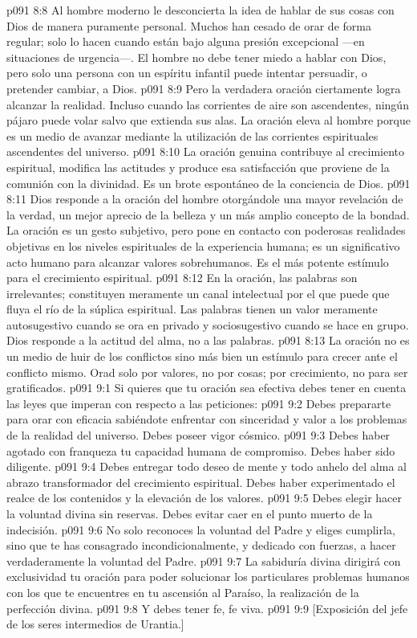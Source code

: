 \vs p091 8:8 \pc Al hombre moderno le desconcierta la idea de hablar de sus cosas con Dios de manera puramente personal. Muchos han cesado de orar de forma regular; solo lo hacen cuando están bajo alguna presión excepcional ---en situaciones de urgencia---. El hombre no debe tener miedo a hablar con Dios, pero solo una persona con un espíritu infantil puede intentar persuadir, o pretender cambiar, a Dios.
\vs p091 8:9 \pc Pero la verdadera oración ciertamente logra alcanzar la realidad. Incluso cuando las corrientes de aire son ascendentes, ningún pájaro puede volar salvo que extienda sus alas. La oración eleva al hombre porque es un medio de avanzar mediante la utilización de las corrientes espirituales ascendentes del universo.
\vs p091 8:10 La oración genuina contribuye al crecimiento espiritual, modifica las actitudes y produce esa satisfacción que proviene de la comunión con la divinidad. Es un brote espontáneo de la conciencia de Dios.
\vs p091 8:11 Dios responde a la oración del hombre otorgándole una mayor revelación de la verdad, un mejor aprecio de la belleza y un más amplio concepto de la bondad. La oración es un gesto subjetivo, pero pone en contacto con poderosas realidades objetivas en los niveles espirituales de la experiencia humana; es un significativo acto humano para alcanzar valores sobrehumanos. Es el más potente estímulo para el crecimiento espiritual.
\vs p091 8:12 En la oración, las palabras son irrelevantes; constituyen meramente un canal intelectual por el que puede que fluya el río de la súplica espiritual. Las palabras tienen un valor meramente autosugestivo cuando se ora en privado y sociosugestivo cuando se hace en grupo. Dios responde a la actitud del alma, no a las palabras.
\vs p091 8:13 La oración no es un medio de huir de los conflictos sino más bien un estímulo para crecer ante el conflicto mismo. Orad solo por valores, no por cosas; por crecimiento, no para ser gratificados.
\vs p091 9:1 Si quieres que tu oración sea efectiva debes tener en cuenta las leyes que imperan con respecto a las peticiones:
\vs p091 9:2 Debes prepararte para orar con eficacia sabiéndote enfrentar con sinceridad y valor a los problemas de la realidad del universo. Debes poseer vigor cósmico.
\vs p091 9:3 Debes haber agotado con franqueza tu capacidad humana de compromiso. Debes haber sido diligente.
\vs p091 9:4 Debes entregar todo deseo de mente y todo anhelo del alma al abrazo transformador del crecimiento espiritual. Debes haber experimentado el realce de los contenidos y la elevación de los valores.
\vs p091 9:5 Debes elegir hacer la voluntad divina sin reservas. Debes evitar caer en el punto muerto de la indecisión.
\vs p091 9:6 No solo reconoces la voluntad del Padre y eliges cumplirla, sino que te has consagrado incondicionalmente, y dedicado con fuerzas, a hacer verdaderamente la voluntad del Padre.
\vs p091 9:7 La sabiduría divina dirigirá con exclusividad tu oración para poder solucionar los particulares problemas humanos con los que te encuentres en tu ascensión al Paraíso, la realización de la perfección divina.
\vs p091 9:8 Y debes tener fe, fe viva.
\vsetoff
\vs p091 9:9 [Exposición del jefe de los seres intermedios de Urantia.]

